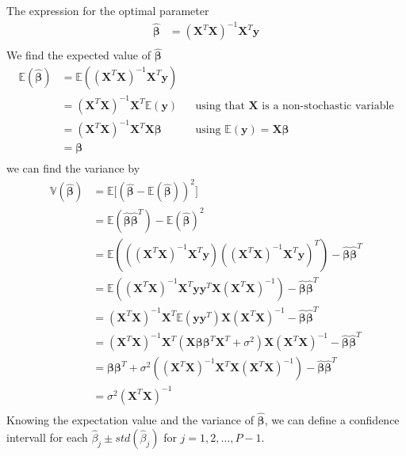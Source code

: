 \documentclass[english,notitlepage]{revtex4-1}
\begin{document}
The expression for the optimal parameter 
\begin{align*}
    \boldsymbol{\hat{\beta}} &= (\boldsymbol{X}^{T} \boldsymbol{X})^{-1} \boldsymbol{X}^{T} \boldsymbol{y} \\
\end{align*}
We find the expected value of $\boldsymbol{\hat{\beta}}$
\begin{align*}
    \mathbb{E}(\boldsymbol{\hat{\beta}}) &= \mathbb{E}((\boldsymbol{X}^{T} \boldsymbol{X})^{-1} \boldsymbol{X}^{T} \boldsymbol{y}) \\
    &= (\boldsymbol{X}^{T} \boldsymbol{X})^{-1} \boldsymbol{X}^{T} \mathbb{E}(\boldsymbol{y}) && \text{using that $\boldsymbol{X}$ is a non-stochastic variable} \\
    &= (\boldsymbol{X}^{T} \boldsymbol{X})^{-1} \boldsymbol{X}^{T} \boldsymbol{X} \boldsymbol{\beta} && \text{using $\mathbb{E}(\boldsymbol{y}) = \boldsymbol{X} \boldsymbol{\beta}$} \\
    &= \boldsymbol{\beta} \\
\end{align*}
we can find the variance by 
\begin{align*}
    \mathbb{V}(\boldsymbol{\hat{\beta}}) &= \mathbb{E} \big[ (\boldsymbol{\hat{\beta}} - \mathbb{E}(\boldsymbol{\hat{\beta}}))^{2} \big] \\
    &= \mathbb{E} (\boldsymbol{\hat{\beta}} \boldsymbol{\hat{\beta}}^{T}) - \mathbb{E}(\boldsymbol{\hat{\beta}})^{2}  \\
    &= \mathbb{E} (((\boldsymbol{X}^{T} \boldsymbol{X})^{-1} \boldsymbol{X}^{T} \boldsymbol{y}) ((\boldsymbol{X}^{T} \boldsymbol{X})^{-1} \boldsymbol{X}^{T} \boldsymbol{y})^{T}) - \boldsymbol{\hat{\beta}}\boldsymbol{\hat{\beta}}^{T}  \\
    &= \mathbb{E} ((\boldsymbol{X}^{T} \boldsymbol{X})^{-1} \boldsymbol{X}^{T} \boldsymbol{y} \boldsymbol{y}^{T} \boldsymbol{X} (\boldsymbol{X}^{T} \boldsymbol{X})^{-1}) - \boldsymbol{\hat{\beta}}\boldsymbol{\hat{\beta}}^{T}  \\
    &= (\boldsymbol{X}^{T} \boldsymbol{X})^{-1} \boldsymbol{X}^{T} \mathbb{E} (\boldsymbol{y} \boldsymbol{y}^{T}) \boldsymbol{X} (\boldsymbol{X}^{T} \boldsymbol{X})^{-1} - \boldsymbol{\hat{\beta}}\boldsymbol{\hat{\beta}}^{T}  \\
    &= (\boldsymbol{X}^{T} \boldsymbol{X})^{-1} \boldsymbol{X}^{T} (\boldsymbol{X} \boldsymbol{\beta} \boldsymbol{\beta}^{T} \boldsymbol{X}^{T} + \sigma^{2}) \boldsymbol{X} (\boldsymbol{X}^{T} \boldsymbol{X})^{-1} - \boldsymbol{\hat{\beta}}\boldsymbol{\hat{\beta}}^{T}  \\
    &= \boldsymbol{\beta} \boldsymbol{\beta}^{T} + \sigma^{2}((\boldsymbol{X}^{T} \boldsymbol{X})^{-1} \boldsymbol{X}^{T} \boldsymbol{X} (\boldsymbol{X}^{T} \boldsymbol{X})^{-1}) - \boldsymbol{\hat{\beta}}\boldsymbol{\hat{\beta}}^{T}  \\
    &= \sigma^{2}(\boldsymbol{X}^{T} \boldsymbol{X})^{-1} \\
\end{align*}
Knowing the expectation value and the variance of $\boldsymbol{\hat{\beta}}$, we can define a confidence intervall for each $\hat{\beta}_{j} \pm std(\hat{\beta}_j)$ for $j=1, 2, \hdots, P-1$.
\end{document}
